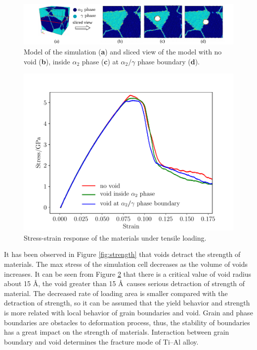 \documentclass[materials,article,accept,moreauthors,pdftex,10pt,a4paper]{Definitions/mdpi}
\begin{document}
\begin{figure}[H]
\centering
\includegraphics[width=1\linewidth]{img/slice-view}
\caption{Model of the simulation (\textbf{a}) and sliced view of the model with no void (\textbf{b}), inside $\alpha_2$ phase (\textbf{c}) at $\alpha_2 / \gamma$ phase boundary (\textbf{d}).}
\label{fig:model-creation}
\end{figure}
\unskip
\begin{figure}[H]
\centering
\includegraphics[width=0.5\linewidth]{img/allline}
\caption{Stress-strain response of the materials under tensile loading.}
\label{fig:stress&strain}
\end{figure}



It has been observed in Figure \ref{fig:strength} that voids detract the strength of  materials. The max stress  of the simulation cell decreases as the volume of voids increases. It can be seen from Figure \ref{fig:stress&strain} that there is a critical value of void radius about 15 \AA, the void greater than 15 \AA\ causes serious detraction of strength of material.  The decreased rate of loading area is smaller compared  with the detraction of strength, so it can be assumed that the  yield behavior and strength is more related with local behavior of grain boundaries and void. Grain and phase boundaries are obstacles to deformation process, thus, the stability of boundaries has a great impact on the strength of materials. Interaction between grain boundary and void determines the fracture mode of   Ti--Al alloy.
\end{document}
